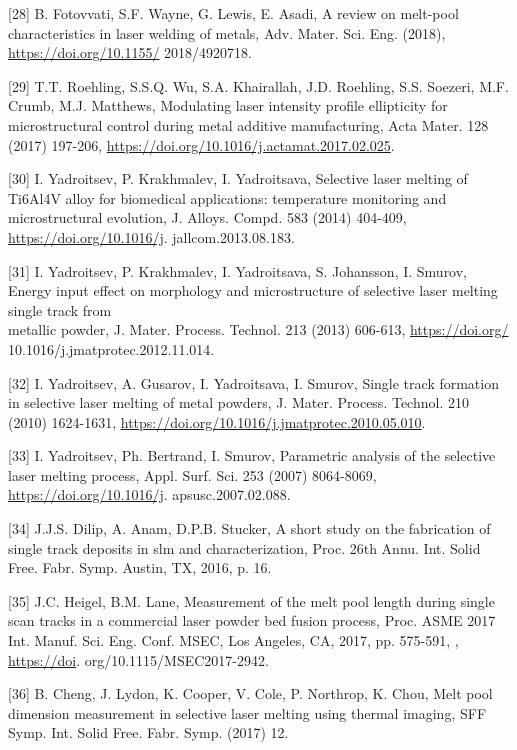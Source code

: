 \documentclass[10pt]{article}
\begin{document}
[28] B. Fotovvati, S.F. Wayne, G. Lewis, E. Asadi, A review on melt-pool characteristics in laser welding of metals, Adv. Mater. Sci. Eng. (2018), \href{https://doi.org/10.1155/}{https://doi.org/10.1155/} 2018/4920718.

[29] T.T. Roehling, S.S.Q. Wu, S.A. Khairallah, J.D. Roehling, S.S. Soezeri, M.F. Crumb, M.J. Matthews, Modulating laser intensity profile ellipticity for microstructural control during metal additive manufacturing, Acta Mater. 128 (2017) 197-206, \href{https://doi.org/10.1016/j.actamat.2017.02.025}{https://doi.org/10.1016/j.actamat.2017.02.025}.

[30] I. Yadroitsev, P. Krakhmalev, I. Yadroitsava, Selective laser melting of Ti6Al4V alloy for biomedical applications: temperature monitoring and microstructural evolution, J. Alloys. Compd. 583 (2014) 404-409, \href{https://doi.org/10.1016/j}{https://doi.org/10.1016/j}. jallcom.2013.08.183.

[31] I. Yadroitsev, P. Krakhmalev, I. Yadroitsava, S. Johansson, I. Smurov, Energy input effect on morphology and microstructure of selective laser melting single track from\\
metallic powder, J. Mater. Process. Technol. 213 (2013) 606-613, \href{https://doi.org/}{https://doi.org/} 10.1016/j.jmatprotec.2012.11.014.

[32] I. Yadroitsev, A. Gusarov, I. Yadroitsava, I. Smurov, Single track formation in selective laser melting of metal powders, J. Mater. Process. Technol. 210 (2010) 1624-1631, \href{https://doi.org/10.1016/j.jmatprotec.2010.05.010}{https://doi.org/10.1016/j.jmatprotec.2010.05.010}.

[33] I. Yadroitsev, Ph. Bertrand, I. Smurov, Parametric analysis of the selective laser melting process, Appl. Surf. Sci. 253 (2007) 8064-8069, \href{https://doi.org/10.1016/j}{https://doi.org/10.1016/j}. apsusc.2007.02.088.

[34] J.J.S. Dilip, A. Anam, D.P.B. Stucker, A short study on the fabrication of single track deposits in slm and characterization, Proc. 26th Annu. Int. Solid Free. Fabr. Symp. Austin, TX, 2016, p. 16.

[35] J.C. Heigel, B.M. Lane, Measurement of the melt pool length during single scan tracks in a commercial laser powder bed fusion process, Proc. ASME 2017 Int. Manuf. Sci. Eng. Conf. MSEC, Los Angeles, CA, 2017, pp. 575-591, , \href{https://doi}{https://doi}. org/10.1115/MSEC2017-2942.

[36] B. Cheng, J. Lydon, K. Cooper, V. Cole, P. Northrop, K. Chou, Melt pool dimension measurement in selective laser melting using thermal imaging, SFF Symp. Int. Solid Free. Fabr. Symp. (2017) 12.
\end{document}

